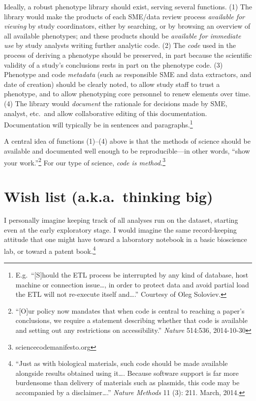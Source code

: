 \documentclass{tufte-handout}
\begin{document}
Ideally, a robust phenotype library should exist, serving several
functions. (1) The library would make the products of each SME/data
review process \emph{available for viewing} by study coordinators,
either by searching, or by browsing an overview of all available
phenotypes; and these products should be
\emph{available for immediate use} by study analysts writing further
analytic code. (2) The \emph{code} used in the process of deriving a
phenotype should be preserved, in part because the scientific validity of a study's
conclusions rests in part on the phenotype code. (3) Phenotype and
code \emph{metadata} (such as responsible SME and data extractors, and
date of creation) should be clearly noted, to allow study staff to
trust a phenotype, and to allow phenotyping core personnel to renew
elements over time. (4) The library would \emph{document} the
rationale for decisions made by SME, analyst, etc.\ and allow
collaborative editing of this documentation. Documentation will
typically be in sentences and paragraphs.\footnote{E.g.\ ``[S]hould
  the ETL process be interrupted by any kind of database, host machine
  or connection issue\ldots{}, in order to protect data and avoid
  partial load the ETL will not re-execute itself and\ldots{}.'' Courtesy
  of Oleg Soloviev.}

\newpage

A central idea of functions (1)--(4) above is that the methods of
science should be available and documented well enough to be
reproducible---in other words, ``show your work.''\footnote{``[O]ur
  policy now mandates that when code is central to reaching a paper's
  conclusions, we require a statement describing whether that code is
  available and setting out any restrictions on accessibility.''
  \emph{Nature} 514:536, 2014-10-30} For our type of science,
\emph{code is method.}\footnote{sciencecodemanifesto.org} 

\section{Wish list (a.k.a.\ thinking big)}

I personally imagine keeping track of all analyses run on the dataset,
starting even at the early exploratory stage. I would imagine the same
record-keeping attitude that one might have toward a laboratory
notebook in a basic bioscience lab, or toward a patent
book.\footnote{``Just as with biological materials, such code should
  be made available alongside results obtained using it\ldots{}.
  Because software support is far more burdensome than delivery of
  materials such as plasmids, this code may be accompanied by a
  disclaimer\ldots{}.'' \emph{Nature Methods} 11 (3): 211. March,
  2014.} %
\end{document}
